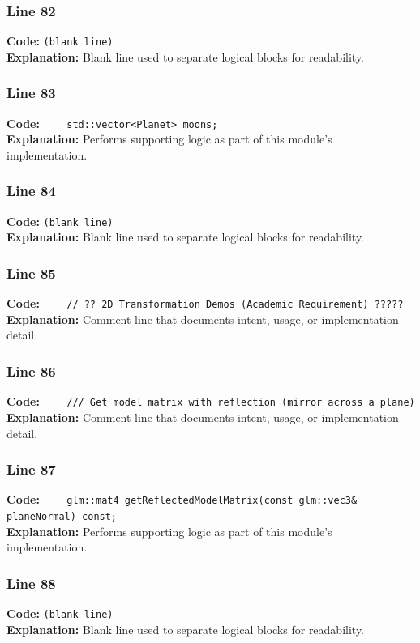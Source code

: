\documentclass[11pt,a4paper]{article}
\begin{document}
\subsubsection*{Line 82}
\textbf{Code:} \texttt{(blank line)}\\
\textbf{Explanation:} Blank line used to separate logical blocks for readability.

\subsubsection*{Line 83}
\textbf{Code:} \verb|    std::vector<Planet> moons;|\\
\textbf{Explanation:} Performs supporting logic as part of this module's implementation.

\subsubsection*{Line 84}
\textbf{Code:} \texttt{(blank line)}\\
\textbf{Explanation:} Blank line used to separate logical blocks for readability.

\subsubsection*{Line 85}
\textbf{Code:} \verb|    // ?? 2D Transformation Demos (Academic Requirement) ?????|\\
\textbf{Explanation:} Comment line that documents intent, usage, or implementation detail.

\subsubsection*{Line 86}
\textbf{Code:} \verb|    /// Get model matrix with reflection (mirror across a plane)|\\
\textbf{Explanation:} Comment line that documents intent, usage, or implementation detail.

\subsubsection*{Line 87}
\textbf{Code:} \verb|    glm::mat4 getReflectedModelMatrix(const glm::vec3& planeNormal) const;|\\
\textbf{Explanation:} Performs supporting logic as part of this module's implementation.

\subsubsection*{Line 88}
\textbf{Code:} \texttt{(blank line)}\\
\textbf{Explanation:} Blank line used to separate logical blocks for readability.
\end{document}
